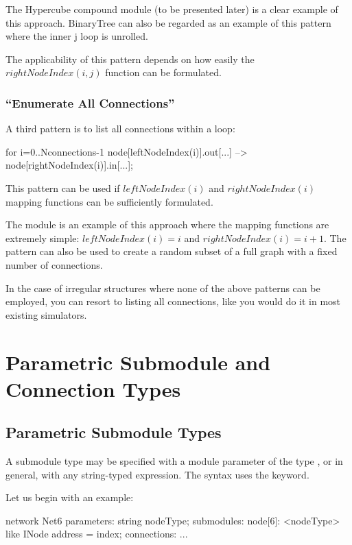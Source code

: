 The Hypercube compound module (to be
presented later) is a clear example of this approach. BinaryTree can
also be regarded as an example of this pattern where the inner j loop
is unrolled.

The applicability of this pattern depends on how easily the $rightNodeIndex(i,j)$
function can be formulated.


\subsubsection{``Enumerate All Connections''}


A third pattern is to list all connections within a loop:

\begin{ned}
for i=0..Nconnections-1 {
    node[leftNodeIndex(i)].out[...] --> node[rightNodeIndex(i)].in[...];
}
\end{ned}

This pattern can be used if $leftNodeIndex(i)$ and $rightNodeIndex(i)$
mapping functions can be sufficiently formulated.

The  module is an example of this approach where the mapping
functions are extremely simple: $leftNodeIndex(i)=i$ and $rightNodeIndex(i) = i+1$.
The pattern can also be used to create a random subset of a full
graph with a fixed number of connections.

In the case of irregular structures where none of the above patterns
can be employed, you can resort to listing all connections, like you
would do it in most existing simulators.



\section{Parametric Submodule and Connection Types}

\subsection{Parametric Submodule Types}
\label{sec:ch-ned-lang:submodule-like}

A submodule type may be specified with a module parameter of the type
, or in general, with any string-typed expression.
The syntax uses the  keyword.

Let us begin with an example:

\begin{ned}
network Net6
{
    parameters:
        string nodeType;
    submodules:
        node[6]: <nodeType> like INode {
            address = index;
        }
    connections:
        ...
}
\end{ned}

